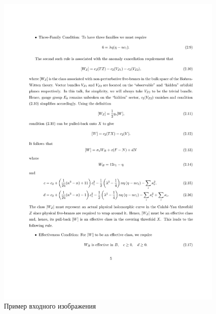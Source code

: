 \begin{figure}
    \includegraphics[scale=0.25]{img/dataset/input.jpg}
    \caption{Пример входного изображения}
    \label{dataset_input}
\end{figure}

